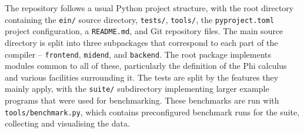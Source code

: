 The repository follows a usual Python project structure, with the root directory containing the \texttt{ein/} source directory, \texttt{tests/}, \texttt{tools/}, the \texttt{pyproject.toml} project configuration, a \texttt{README.md}, and Git repository files. The main source directory is split into three subpackages that correspond to each part of the compiler -- \texttt{frontend}, \texttt{midend}, and \texttt{backend}. The root package implements modules common to all of these, particularly the definition of the Phi calculus and various facilities surrounding it. The tests are split by the features they mainly apply, with the \texttt{suite/} subdirectory implementing larger example programs that were used for benchmarking. These benchmarks are run with \texttt{tools/benchmark.py}, which contains preconfigured benchmark runs for the suite, collecting and visualising the data.

